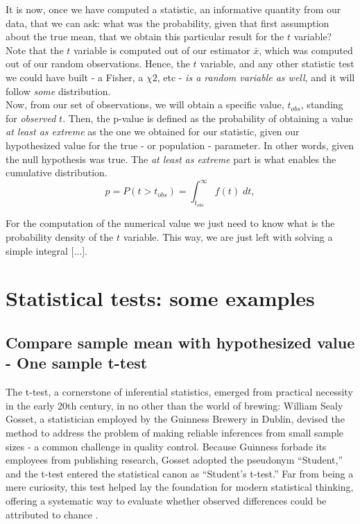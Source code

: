 \documentclass{book}
\begin{document}
It is now, once we have computed a statistic, an informative quantity from our data, that we can ask: what was the probability, given that first assumption about the true mean, that we obtain this particular result for the $t$ variable? Note that the $t$ variable is computed out of our estimator $\bar{x}$, which was computed out of our random observations. Hence, the $t$ variable, and any other statistic test we could have built - a Fisher, a $\chi2$, etc -  \textit{is a random variable as well}, and it will follow \textit{some} distribution.\\

Now, from our set of observations, we will obtain a specific value, $t_{obs}$, standing for \textit{observed} $t$. Then, the p-value is defined as the probability of obtaining a value \textit{at least as extreme} as the one we obtained for our statistic, given our hypothesized value for the true - or population - parameter. In other words, given the null hypothesis was true. The \textit{at least as extreme} part is what enables the cumulative distribution. \\

\begin{equation}
    p = P(t > t_{obs}) = \int_{t_{obs}}^{\infty} \; f(t) \; dt,
\end{equation}

For the computation of the numerical value we just need to know what is the probability density of the $t$ variable. This way, we are just left with solving a simple integral [...].

\newpage

\section{Statistical tests: some examples}

\subsection{Compare sample mean with hypothesized value - One sample t-test}

The t-test, a cornerstone of inferential statistics, emerged from practical necessity in the early 20th century, in no other than the world of brewing: William Sealy Gosset, a statistician employed by the Guinness Brewery in Dublin, devised the method to address the problem of making reliable inferences from small sample sizes - a common challenge in quality control. Because Guinness forbade its employees from publishing research, Gosset adopted the pseudonym “Student,” and the t-test entered the statistical canon as “Student’s t-test.” Far from being a mere curiosity, this test helped lay the foundation for modern statistical thinking, offering a systematic way to evaluate whether observed differences could be attributed to chance \cite{student1908}.\\
\end{document}
